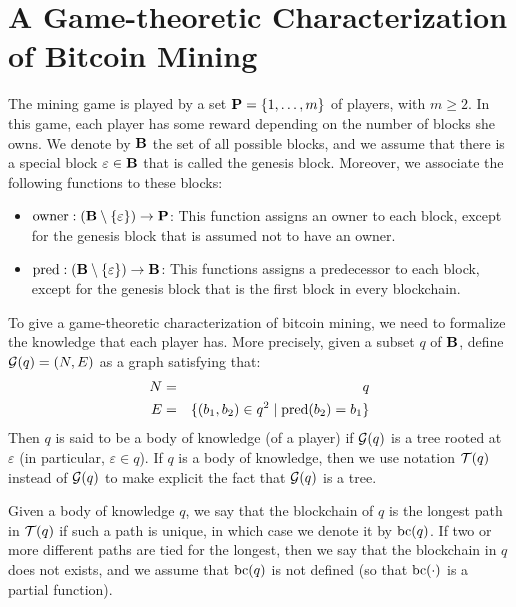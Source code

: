 \documentclass{article}
\begin{document}


\section{A Game-theoretic Characterization of Bitcoin Mining}

The mining game is played by a set $\mathbf{P} = \{1, \ldots, m\}$ of players, with $m \geq 2$. In this game, each player has some reward depending on the number of blocks she owns. We denote by $\mathbf{B}$ the set of all possible blocks, and we assume that there is a special block $\varepsilon \in \mathbf{B}$ that is called the genesis block. Moreover, we associate the following functions to these blocks:
\begin{itemize}
\item $\text{owner} : (\mathbf{B} \setminus \{\varepsilon\}) \to \mathbf{P}$: This function assigns an owner to each block, except for the genesis block that is assumed not to have an owner.

\item $\text{pred} : (\text{\bf B} \setminus \{\varepsilon\}) \to \text{\bf B}$: This functions assigns a predecessor to each block, except for the genesis block that is the first block in every blockchain.
\end{itemize}
To give a game-theoretic characterization of bitcoin mining, we need to formalize the knowledge that each player has. More precisely, given a subset $q$ of $\mathbf{B}$, define $\mathcal{G}(q) = (N,E)$ as a graph satisfying that:
\begin{eqnarray*}
N &=& q\\
E &=& \{ (b_1,b_2) \in q^2 \mid \text{pred}(b_2) = b_1\}
\end{eqnarray*}
Then $q$ is said to be a body of knowledge (of a player) if $\mathcal{G}(q)$ is a tree rooted at $\varepsilon$ (in particular, $\varepsilon \in q$). If $q$ is a body of knowledge, then we use notation $\mathcal{T}(q)$ instead of $\mathcal{G}(q)$ to make explicit the fact that $\mathcal{G}(q)$ is a tree.

Given a body of knowledge $q$, we say that the blockchain of $q$ is the longest path in $\mathcal{T}(q)$ if such a path is unique, in which case we denote it by $\text{bc}(q)$. If two or more different paths are tied for the longest, then we say that the blockchain in $q$ does not exists, and we assume that $\text{bc}(q)$ is not defined (so that $\text{bc}(\cdot)$ is a partial function).
\end{document}
